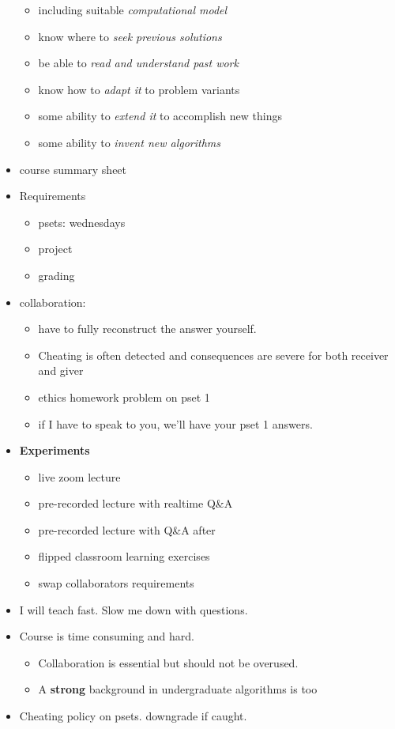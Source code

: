 \documentclass{article}
\begin{document}
\begin{itemize}
\begin{itemize}
  \item including suitable \emph{computational model}
  \item know where to \emph{seek previous solutions}
  \item be able to \emph{read and understand past work}
  \item know how to \emph{adapt it} to problem variants
  \item some ability to \emph{extend it} to accomplish new things
  \item some ability to \emph{invent new algorithms}
  \end{itemize}
\item course summary sheet
\item Requirements
  \begin{itemize}
  \item psets: wednesdays
  \item project
  \item grading
  \end{itemize}
\item collaboration: 
  \begin{itemize}
  \item have to fully reconstruct the answer yourself.
  \item Cheating is often detected and consequences are severe for both receiver and giver
  \item ethics homework problem on pset 1
  \item if I have to speak to you, we'll have your pset 1 answers.
  \end{itemize}
\item {\bf Experiments}
  \begin{itemize}
  \item live zoom lecture
  \item pre-recorded lecture with realtime Q\&A
  \item pre-recorded lecture with Q\&A after
  \item flipped classroom learning exercises
  \item swap collaborators requirements
    
  \end{itemize}
\item I will teach fast.  Slow me down with questions.
\item Course is time consuming and hard.  
  \begin{itemize}
  \item Collaboration is essential but should not be overused.
  \item A {\bf strong} background in undergraduate algorithms is too
  \end{itemize}
\item Cheating policy on psets.  downgrade if caught.
\end{itemize}
\end{document}
